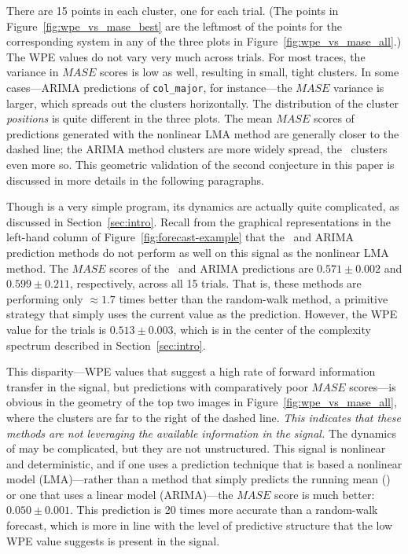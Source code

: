 There are 15 points in each cluster, one for each trial.  (The points
in Figure~\ref{fig:wpe_vs_mase_best} are the leftmost of the points
for the corresponding system in any of the three plots in
Figure~\ref{fig:wpe_vs_mase_all}.)  The WPE values do not vary very
much across trials.  For most traces, the variance in $MASE$ scores is
low as well, resulting in small, tight clusters.  In some
cases---ARIMA predictions of {\tt col\_major}, for instance---the
$MASE$ variance is larger, which spreads out the clusters
horizontally.  The distribution of the cluster {\sl positions} is
quite different in the three plots.  The mean $MASE$ scores of
predictions generated with the nonlinear LMA method are generally
closer to the dashed line; the ARIMA method clusters are more
widely spread, the \naive ~clusters even more so.  This geometric
validation of the second conjecture in this paper is discussed in more
details in the following paragraphs.

Though \col is a very simple program, its dynamics are actually quite
complicated, as discussed in Section~\ref{sec:intro}.  Recall from the
graphical representations in the left-hand column of
Figure~\ref{fig:forecast-example} that the \naive ~and ARIMA
prediction methods do not perform as well on this signal as the
nonlinear LMA method.  The $MASE$ scores of the \naive ~and ARIMA
predictions are $0.571 \pm 0.002$ and $0.599 \pm 0.211$, respectively,
across all 15 trials.  That is, these methods are performing only
$\approx 1.7$ times better than the random-walk method, a primitive
strategy that simply uses the current value as the prediction.
However, the WPE value for the \col trials is $0.513 \pm 0.003$, which
is in the center of the complexity spectrum described in
Section~\ref{sec:intro}.

This disparity---WPE values that suggest a high rate of forward
information transfer in the signal, but predictions with comparatively
poor $MASE$ scores---is obvious in the geometry of the top two images
in Figure~\ref{fig:wpe_vs_mase_all}, where the \col clusters are far
to the right of the dashed line.  {\sl This indicates that these
  methods are not leveraging the available information in the signal.}
The dynamics of \col may be complicated, but they are not
unstructured.  This signal is nonlinear and deterministic, and if one
uses a prediction technique that is based a nonlinear model
(LMA)---rather than a method that simply predicts the running mean
(\naive) or one that uses a linear model (ARIMA)---the $MASE$ score is
much better: $0.050 \pm 0.001$.  This prediction is 20 times more
accurate than a random-walk forecast, which is more in line with the
level of predictive structure that the low WPE value suggests is
present in the signal.  

